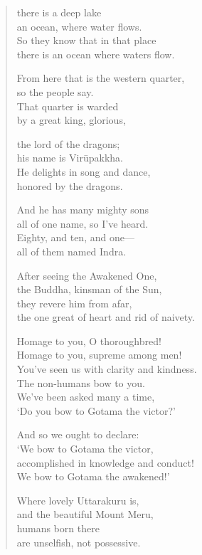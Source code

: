 \documentclass[12pt,openany]{book}%
\begin{document}
\begin{verse}
there is a deep lake \\
an ocean, where water flows. \\
So they know that in that place \\
there is an ocean where waters flow. 

From here that is the western quarter, \\
so the people say. \\
That quarter is warded \\
by a great king, glorious, 

the lord of the dragons; \\
his name is \textsanskrit{Virūpakkha}. \\
He delights in song and dance, \\
honored by the dragons. 

And he has many mighty sons \\
all of one name, so I’ve heard. \\
Eighty, and ten, and one—\\
all of them named Indra. 

After seeing the Awakened One, \\
the Buddha, kinsman of the Sun, \\
they revere him from afar, \\
the one great of heart and rid of naivety. 

Homage to you, O thoroughbred! \\
Homage to you, supreme among men! \\
You’ve seen us with clarity and kindness. \\
The non-humans bow to you. \\
We’ve been asked many a time, \\
‘Do you bow to Gotama the victor?’ 

And so we ought to declare: \\
‘We bow to Gotama the victor, \\
accomplished in knowledge and conduct! \\
We bow to Gotama the awakened!’ 

Where lovely Uttarakuru is, \\
and the beautiful Mount Meru, \\
humans born there \\
are unselfish, not possessive. 


\end{verse}
\end{document}
